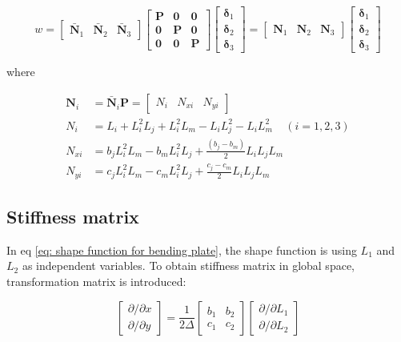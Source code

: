 \begin{equation}\label{key}
w = \begin{bmatrix}
\bar{\mathbf{N}}_1 & \bar{\mathbf{N}}_2 & \bar{\mathbf{N}}_3
\end{bmatrix} \begin{bmatrix}
\mathbf{P} & \mathbf{0} & \mathbf{0} \\ 
\mathbf{0} & \mathbf{P} & \mathbf{0} \\ 
\mathbf{0} & \mathbf{0} & \mathbf{P}
\end{bmatrix} \begin{bmatrix}
\mathbf{\delta}_1 \\ 
\mathbf{\delta}_2 \\ 
\mathbf{\delta}_3
\end{bmatrix} = \begin{bmatrix}
\mathbf{N}_1 & \mathbf{N}_2 & \mathbf{N}_3
\end{bmatrix} \begin{bmatrix}
\mathbf{\delta}_1 \\ 
\mathbf{\delta}_2 \\ 
\mathbf{\delta}_3
\end{bmatrix}
\end{equation}

where

\begin{align*}\label{eq: shape function in area coordinates for bending plate}
\mathbf{N}_i &= \bar{\mathbf{N}}_i \mathbf{P} = \begin{bmatrix}
N_i & N_{xi} & N_{yi}
\end{bmatrix}\\
N_i &= L_i + L_i^2 L_j + L_i^2 L_m - L_i L_j^2 - L_i L_m^2  ~~~~~(i=1,2,3) \\
N_{xi} &= b_j L_i^2 L_m - b_m L_i^2 L_j + \frac{(b_j-b_m)}{2}L_i L_j L_m \\
N_{yi} &= c_j L_i^2 L_m - c_m L_i^2 L_j + \frac{c_j - c_m}{2} L_i L_j L_m
\end{align*}

\subsection{Stiffness matrix}
In eq \ref{eq: shape function for bending plate}, the shape function is using $ L_1 $ and $ L_2 $ as independent variables. To obtain stiffness matrix in global space, transformation matrix is introduced:

\begin{equation}\label{key}
\begin{bmatrix}
\partial / \partial x \\ 
\partial / \partial y
\end{bmatrix} = \frac{1}{2\Delta} \begin{bmatrix}
b_1 & b_2 \\ 
c_1 & c_2
\end{bmatrix} \begin{bmatrix}
\partial / \partial L_1 \\ 
\partial / \partial L_2
\end{bmatrix} 
\end{equation}

